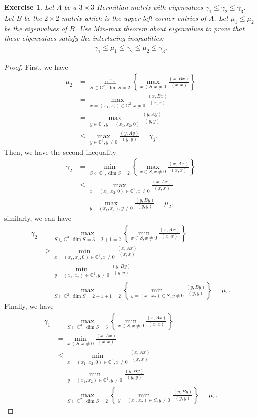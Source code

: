 \documentclass[11pt]{article}
\newtheorem{exercise}{Exercise}[section]
\theoremstyle{definition}
\numberwithin{equation}{subsection}
\begin{document}
\begin{exercise}{\rm *}
Let $A$ be a $3 \times 3$ Hermitian matrix with eigenvalues $\gamma_1 \leq \gamma_2 \leq \gamma_3$. Let $B$ be the $2 \times 2$ matrix which is the upper left corner entries of $A$. Let $\mu_1 \leq \mu_2$ be the eigenvalues of $B$. Use Min-max theorem about eigenvalues to prove that these eigenvalues satisfy the interlacing inequalities:
\begin{align*}
    \gamma_1 \leq \mu_1 \leq \gamma_2 \leq \mu_2 \leq \gamma_3.
\end{align*}
\end{exercise}
\begin{proof}
First, we have
\begin{align*}
    \mu_2 & = \min_{S \subset \mathbb{C}^2, \dim S = 2} \left\{\max_{x \in S, x \neq 0} \frac{(x, Bx)}{(x,x)} \right\} \\
    & = \max_{x =(x_1, x_2) \in \mathbb{C}^2, x \neq 0} \frac{(x, Bx)}{(x,x)} \\
    & = \max_{y \in \mathbb{C}^3, y = (x_1, x_2, 0)} \frac{(y, Ay)}{(y,y)} \\
    & \leq \max_{y \in \mathbb{C}^3, y \neq 0} \frac{(y, Ay)}{(y,y)} = \gamma_3.
\end{align*}
Then, we have the second inequality 
\begin{align*}
    \gamma_2 & = \min_{S \subset \mathbb{C}^3, \dim S = 2} \left\{\max_{x \in S, x \neq 0} \frac{(x, Ax)}{(x,x)} \right\}\\
    & \leq \max_{x = (x_1, x_2, 0) \in \mathbb{C}^2, x \neq 0} \frac{(x, Ax)}{(x,x)} \\
    & = \max_{y = (x_1, x_2), y \neq 0} \frac{(y, By)}{(y, y)} = \mu_2,
\end{align*}
similarly, we can have 
\begin{align*}
    \gamma_2 & = \max_{S \subset \mathbb{C}^3, \dim S = 3 - 2 + 1 = 2} \left\{\min_{x \in S, x \neq 0} \frac{(x, Ax)}{(x,x)} \right\} \\
    & \geq \min_{x = (x_1, x_2, 0) \in \mathbb{C}^3, x \neq 0} \frac{(x, Ax)}{(x, x)} \\
    & = \min_{y = (x_1, x_2) \in \mathbb{C}^2, y \neq 0} \frac{(y, By)}{(y, y)} \\
    & = \max_{S \subset \mathbb{C}^2, \dim S = 2 - 1 + 1 = 2} \left\{ \min_{y = (x_1, x_2) \in S, y \neq 0} \frac{(y, By)}{(y, y)} \right\} = \mu_1.
\end{align*}
Finally, we have
\begin{align*}
    \gamma_1 & = \max_{S \subset \mathbb{C}^3, \dim S = 3} \left\{ \min_{x \in S, x \neq 0} \frac{(x, Ax)}{(x, x)} \right\} \\
    & = \min_{x \in S, x \neq 0} \frac{(x, Ax)}{(x, x)} \\
    & \leq \min_{x = (x_1, x_2, 0) \in \mathbb{C}^3, x \neq 0} \frac{(x, Ax)}{(x, x)} \\
    & = \min_{y = (x_1, x_2) \in \mathbb{C}^2, y \neq 0} \frac{(y, By)}{(y, y)} \\
    & = \max_{S \subset \mathbb{C}^2, \dim S = 2} \left\{ \min_{y = (x_1, x_2) \in S, y \neq 0} \frac{(y, By)}{(y, y)} \right\} = \mu_1.
\end{align*}
\end{proof}
\end{document}
